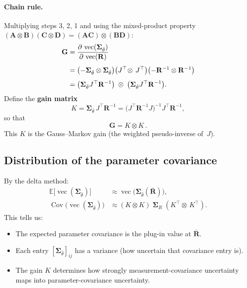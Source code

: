 \documentclass[11pt]{article}
\newcommand{\vect}{\operatorname{vec}}
\newcommand{\Cov}{\operatorname{Cov}}
\begin{document}
\paragraph{Chain rule.}
Multiplying steps 3, 2, 1 and using the mixed-product property
$(\mathbf{A}\!\otimes\!\mathbf{B})(\mathbf{C}\!\otimes\!\mathbf{D})
= (\mathbf{A}\mathbf{C})\!\otimes\!(\mathbf{B}\mathbf{D})$:
\begin{align}
  \mathbf{G}
    &= \frac{\partial\,\vect(\boldsymbol{\Sigma}_{\hat\theta})}
            {\partial\,\vect(\mathbf{R})} \notag\\[4pt]
    &= \bigl(-\boldsymbol{\Sigma}_{\hat\theta}
        \otimes \boldsymbol{\Sigma}_{\hat\theta}\bigr)
       \bigl(J^\top \!\otimes\, J^\top\bigr)
       \bigl(-\mathbf{R}^{-1} \otimes \mathbf{R}^{-1}\bigr)
       \notag\\[4pt]
    &= \bigl(\boldsymbol{\Sigma}_{\hat\theta} J^\top
       \mathbf{R}^{-1}\bigr)
       \;\otimes\;
       \bigl(\boldsymbol{\Sigma}_{\hat\theta} J^\top
       \mathbf{R}^{-1}\bigr).
\end{align}
Define the \textbf{gain matrix}
\begin{equation}
  K
    = \boldsymbol{\Sigma}_{\hat\theta}\,J^\top \mathbf{R}^{-1}
    = \bigl(J^\top \mathbf{R}^{-1} J\bigr)^{-1}
      J^\top \mathbf{R}^{-1},
\end{equation}
so that
\begin{equation}
  \boxed{\mathbf{G} = K \otimes K\,.}
\end{equation}
This $K$ is the Gauss--Markov gain (the weighted pseudo-inverse of~$J$).

\subsection{Distribution of the parameter covariance}

By the delta method:
\begin{equation}
  \boxed{
  \begin{aligned}
    \mathbb{E}\!\bigl[\vect(\boldsymbol{\Sigma}_{\hat\theta})\bigr]
      &\approx \vect\!\bigl(\boldsymbol{\Sigma}_{\hat\theta}
        (\bar{\mathbf{R}})\bigr), \\[6pt]
    \Cov\!\bigl(\vect(\boldsymbol{\Sigma}_{\hat\theta})\bigr)
      &\approx (K \otimes K)\;
        \boldsymbol{\Sigma}_{\!R}\;
        (K^\top \!\otimes\, K^\top).
  \end{aligned}
  }
\end{equation}
This tells us:
\begin{itemize}
  \item The expected parameter covariance is the plug-in value at
    $\bar{\mathbf{R}}$.
  \item Each entry $[\boldsymbol{\Sigma}_{\hat\theta}]_{ij}$ has a
    variance (how uncertain that covariance entry is).
  \item The gain $K$ determines how strongly measurement-covariance
    uncertainty maps into parameter-covariance uncertainty.
\end{itemize}
\end{document}
